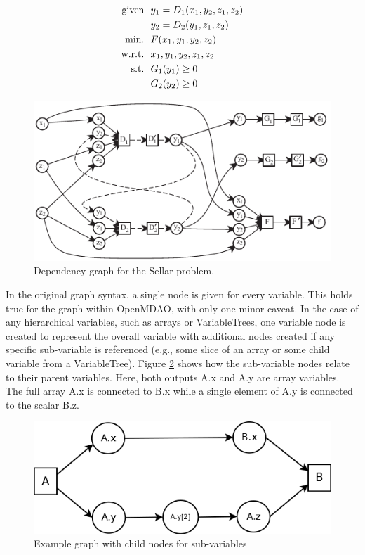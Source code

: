 \documentclass[]{aiaa-tc} %
\newcommand{\txt}{\textrm}
\begin{document}
    \begin{align}
        \txt{given} & \ \ y_1 = D_1(x_1,y_2,z_1,z_2) \notag
        \\      & \ \ y_2 = D_2(y_1,z_1,z_2) \notag
        \\\txt{min.} &\ \ F(x_1,y_1,y_2,z_2) \notag
        \\\txt{w.r.t.} & \ \ x_1,y_1,y_2,z_1,z_2 \notag
        \\\txt{s.t.} & \ \ G_1(y_1) \geq 0 \notag
        \\     & \ \ G_2(y_2) \geq 0
        \label{eqn:sellar_formulation}
    \end{align}


    \begin{figure}[!htb]\begin{center}
      \includegraphics[width=.8\textwidth]{images/sellar_cycles}
      \caption{ Dependency graph for the Sellar problem. \label{fig:sellar_graph}}
    \end{center}\end{figure}

    In the original graph syntax, a single node is given for every variable. This holds true for the graph
    within OpenMDAO, with only one minor caveat. In the case of any hierarchical variables, such as arrays
    or VariableTrees, one variable node is created to represent the overall variable with additional nodes
    created if any specific sub-variable is referenced (e.g., some slice of an array or some child variable from a 
    VariableTree). Figure \ref{fig:subvars} shows how the sub-variable nodes relate to their parent variables. Here,
    both outputs A.x and A.y are array variables. The full array A.x is connected to B.x while a single element
    of A.y is connected to the scalar B.z.

     \begin{figure}[!htb]\begin{center}
      \includegraphics[width=.8\textwidth]{images/Graph1}
      \caption{ Example graph with child nodes for sub-variables \label{fig:subvars}}
    \end{center}\end{figure}
\end{document}

